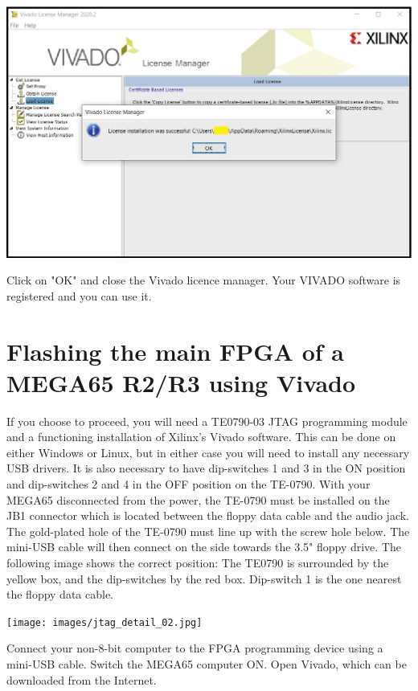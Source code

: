 \includegraphics[width=\linewidth]{images/VivadoInstimg032.jpg}

Click on "OK" and close the Vivado licence manager.
Your VIVADO software is registered and you can use it.



\section{Flashing the main FPGA of a MEGA65 R2/R3 using Vivado}
\label{sec:mainfpgaflashing}

If you choose to proceed, you will need a TE0790-03 JTAG programming module and a functioning
installation of Xilinx's Vivado software.  This can be done on either Windows or Linux, but
in either case you will need to install any necessary USB drivers. It is
also necessary to have
dip-switches 1 and 3 in the ON position and dip-switches 2 and 4 in the
OFF position on the TE-0790.
With your MEGA65 disconnected from the power, the TE-0790 must be
installed on the JB1 connector which is located between the floppy data cable and the audio jack.
The gold-plated hole of the TE-0790 must line up with the screw
hole below.  The mini-USB cable will then connect on the side towards the 3.5" floppy drive.
The following image shows the correct position: The TE0790 is surrounded by the yellow box,
and the dip-switches by the red box. Dip-switch 1 is the one nearest the floppy data cable.

\texttt{[image: images/jtag\_detail\_02.jpg]}

Connect your non-8-bit computer to the FPGA programming device using a
mini-USB cable. Switch the MEGA65 computer ON. Open Vivado, which can
be downloaded from the Internet.

